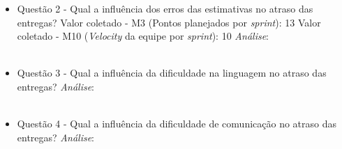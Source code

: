 \begin{apendicesenv}
\begin{itemize}
	  \item Questão 2 - Qual a influência dos erros das estimativas no atraso das entregas? 
	    \subitem Valor coletado - M3 (Pontos planejados por \textit{sprint}): 13
	    \subitem Valor coletado - M10 (\textit{Velocity} da equipe por \textit{sprint}): 10
	    \subitem \textit{Análise}:
	    \\
	    \\
	    
	  \item Questão 3 - Qual a influência da dificuldade na linguagem no atraso das entregas?
	    \subitem \textit{Análise}:
	  \\
	  \\
	  
	  \item Questão 4 - Qual a influência da dificuldade de comunicação no atraso das entregas?
	    \subitem \textit{Análise}:
	  \\
	  \\
	  
	\end{itemize}



	
	
\end{apendicesenv}
